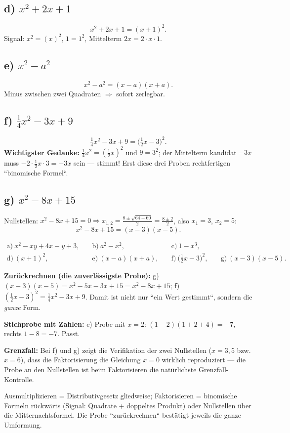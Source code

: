 \subsection*{d) $x^2+2x+1$}
\begin{equation}
  x^2+2x+1=(x+1)^2 .
\end{equation}
Signal: $x^2=(x)^2$, $1=1^2$, Mittelterm $2x=2\cdot x\cdot1$.

\subsection*{e) $x^2-a^2$}
\begin{equation}
  x^2-a^2=(x-a)(x+a) .
\end{equation}
Minus zwischen zwei Quadraten $\Rightarrow$ sofort zerlegbar.

\subsection*{f) $\tfrac14x^2-3x+9$}
\begin{equation}
  \tfrac14x^2-3x+9=\bigl(\tfrac12x-3\bigr)^2 .
\end{equation}
\textbf{Wichtigster Gedanke:} $\tfrac14x^2=(\tfrac12x)^2$ und $9=3^2$;
der Mittelterm kandidat $-3x$ muss $-2\cdot\tfrac12x\cdot3=-3x$ sein ---
stimmt! Erst diese drei Proben rechtfertigen ``binomische Formel``.

\subsection*{g) $x^2-8x+15$}
Nullstellen: $x^2-8x+15=0 \Rightarrow x_{1,2}=\frac{8\pm\sqrt{64-60}}{2}
=\frac{8\pm2}{2}$, also $x_1=3$, $x_2=5$:
\begin{equation}
  x^2-8x+15=(x-3)(x-5) .
\end{equation}

\begin{ergebnis}
\begin{align*}
  \text{a)}\ x^2-xy+4x-y+3, &\quad
  \text{b)}\ a^2-x^2, &\quad
  \text{c)}\ 1-x^3,\\
  \text{d)}\ (x+1)^2, &\quad
  \text{e)}\ (x-a)(x+a), &\quad
  \text{f)}\ \bigl(\tfrac12x-3\bigr)^2, &\quad
  \text{g)}\ (x-3)(x-5).
\end{align*}
\end{ergebnis}

\begin{kontrolle}
\textbf{Zurückrechnen (die zuverlässigste Probe):} g) $(x-3)(x-5)
=x^2-5x-3x+15=x^2-8x+15$; f) $(\tfrac12x-3)^2=\tfrac14x^2-3x+9$. Damit
ist nicht nur ``ein Wert gestimmt``, sondern die \emph{ganze} Form.

\textbf{Stichprobe mit Zahlen:} c) Probe mit $x=2$: $(1-2)(1+2+4)=-7$,
rechts $1-8=-7$. Passt.

\textbf{Grenzfall:} Bei f) und g) zeigt die Verifikation der zwei
Nullstellen ($x=3,5$ bzw. $x=6$), dass die Faktorisierung die Gleichung
$x=0$ wirklich reproduziert --- die Probe an den Nullstellen ist beim
Faktorisieren die nat\"urlichste Grenzfall-Kontrolle.
\end{kontrolle}

\begin{merksatz}
Ausmultiplizieren = Distributivgesetz gliedweise; Faktorisieren =
binomische Formeln rückwärts (Signal: Quadrate + doppeltes Produkt) oder
Nullstellen über die Mitternachtsformel. Die Probe ``zurückrechnen``
bestätigt jeweils die ganze Umformung.
\end{merksatz}
